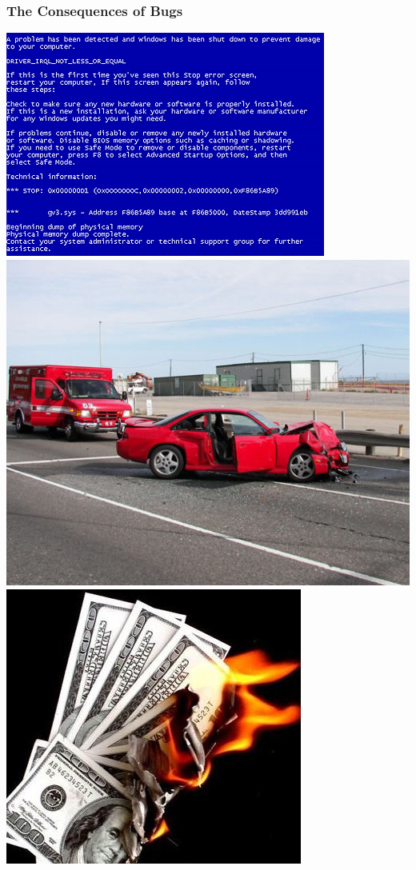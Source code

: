 \documentclass[bigger]{beamer}
\begin{document}
\begin{frame}
\frametitle{The Consequences of Bugs}
\label{sec-2}


\includegraphics[scale=0.25]{../pictures/BSOD.png}
\includegraphics[scale=0.25]{../pictures/car-crash.jpg} \\
\includegraphics[scale=0.25]{../pictures/burning_money.jpg}
\end{frame}
\end{document}
